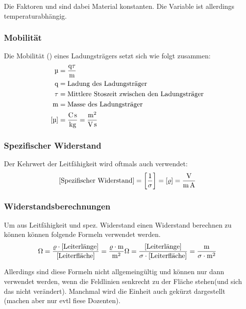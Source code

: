 Die Faktoren  und  sind dabei Material konstanten. 
Die Variable \say{\textmu} ist allerdings temperaturabhängig. 

\subsubsection{Mobilität}

Die Mobilität (\textmu) eines Ladungsträgers setzt sich wie folgt zusammen:
\begin{align*}
    \text{\textmu}& =  \frac{\text{q}\tau}{\text{m}}\\
    \text{q}& = \text{Ladung des Ladungsträger}\\
    \tau& = \text{Mittlere Stoszeit zwischen den Ladungsträger}\\
    \text{m}& = \text{Masse des Ladungsträger}\\
    \newline
    [\text{\textmu}]& = \unit[per-mode=fraction]{\coulomb\second\per\kilo\gram} = \unit[per-mode=fraction]{\square\meter\per\volt\per\second}
\end{align*}


\subsubsection{Spezifischer Widerstand}

Der Kehrwert der Leitfähigkeit wird oftmals auch verwendet:\\

\[ [\text{Spezifischer Widerstand}] = \left[ \frac{1}{\sigma} \right] = [\varrho] = \unit[per-mode=fraction]{\volt\per\meter\per\ampere}\]

\subsubsection{Widerstandsberechnungen}

Um aus Leitfähigkeit und spez. Widerstand einen Widerstand berechnen zu können können folgende Formeln verwendet werden.\\
\[
\unit{\ohm} = \frac{\varrho\cdot[\text{Leiterlänge}]}{[\text{Leiterfläche}]} = \frac{\varrho \cdot \unit{\meter}}{\unit{\square\meter}}\\
\unit{\ohm} = \frac{[\text{Leiterlänge}]}{\sigma\cdot[\text{Leiterfläche}]} = \frac{\unit{\meter}}{\sigma\cdot\unit{\square\meter}}\\
\]

Allerdings sind diese Formeln nicht allgemeingültig und können nur dann verwendet werden, wenn die Feldlinien senkrecht zu der Fläche stehen(und sich das nicht verändert). 
Manchmal wird die Einheit auch gekürzt dargestellt (machen aber nur evtl fiese Dozenten).

